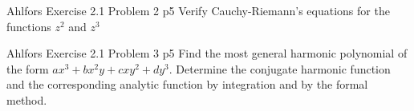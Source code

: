 \documentclass[a4paper, 11pt]{article}
\begin{document}
	
	
	\begin{problem}{%
			Ahlfors Exercise 2.1 Problem 2
		}{p5%
		}
		Verify Cauchy-Riemann’s equations for the functions $z^2$ and $z^3$
	\end{problem}
	
	
	
	\begin{problem}{%
			Ahlfors Exercise 2.1 Problem 3
		}{p5%
		}
Find the most general harmonic polynomial of the form $ax^3+bx^2y+cxy^2+dy^3$. Determine the conjugate harmonic function and the corresponding analytic function by integration and by the formal method.
	\end{problem}
	
\end{document}
